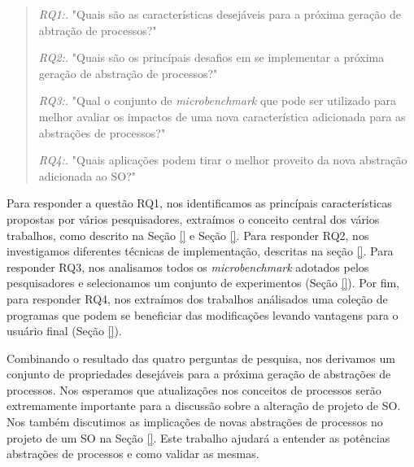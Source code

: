 \begin{quote}
 \item \textit{RQ1:.} "Quais são as características desejáveis para a próxima geração de abtração de processos?"
 \item \textit{RQ2:.} "Quais são os princípais desafios em se implementar a próxima geração de abstração de processos?"
 \item \textit{RQ3:.} "Qual o conjunto de \emph{microbenchmark} que pode ser utilizado para melhor avaliar os impactos de uma nova característica adicionada para as abstrações de processos?"
 \item \textit{RQ4:.} "Quais aplicações podem tirar o melhor proveito da nova abstração adicionada ao SO?"
\end{quote}

Para responder a questão RQ1, nos identificamos as princípais características
propostas por vários pesquisadores, extraímos o conceito central dos vários
trabalhos, como descrito na Seção \ref{} e Seção \ref{}. Para responder RQ2,
nos investigamos diferentes técnicas de implementação, descritas na seção
\ref{}. Para responder RQ3, nos analisamos todos os \emph{microbenchmark}
adotados pelos pesquisadores e selecionamos um conjunto de experimentos (Seção
\ref{}). Por fim, para responder RQ4, nos extraímos dos trabalhos análisados
uma coleção de programas que podem se beneficiar das modificações levando
vantagens para o usuário final (Seção \ref{}).

Combinando o resultado das quatro perguntas de pesquisa, nos derivamos um
conjunto de propriedades desejáveis para a próxima geração de abstrações de
processos. Nos esperamos que atualizações nos conceitos de processos serão
extremamente importante para a discussão sobre a alteração de projeto de SO.
Nos também discutimos as implicações de novas abstrações de processos no
projeto de um SO na Seção \ref{}. Este trabalho ajudará a entender as potências
abstrações de processos e como validar as mesmas.
